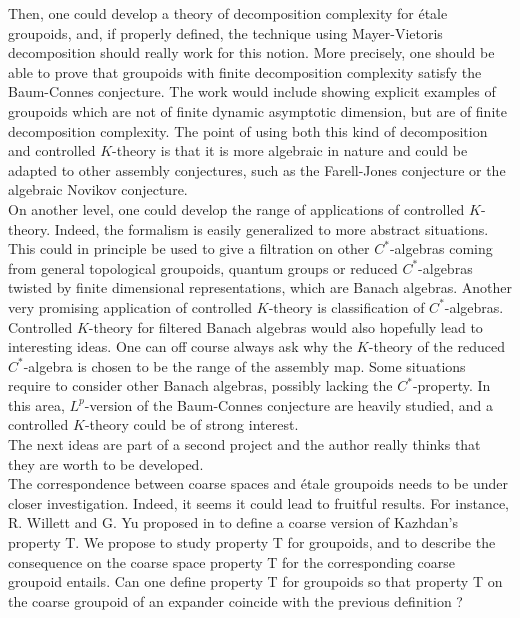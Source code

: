 Then, one could develop a theory of decomposition complexity for étale groupoids, and, if properly defined, the technique using Mayer-Vietoris decomposition should really work for this notion. More precisely, one should be able to prove that groupoids with finite decomposition complexity satisfy the Baum-Connes conjecture. The work would include showing explicit examples of groupoids which are not of finite dynamic asymptotic dimension, but are of finite decomposition complexity. The point of using both this kind of decomposition and controlled $K$-theory is that it is more algebraic in nature and could be adapted to other assembly conjectures, such as the Farell-Jones conjecture or the algebraic Novikov conjecture. \cite{RTY} \\

On another level, one could develop the range of applications of controlled $K$-theory. Indeed, the formalism is easily generalized to more abstract situations. This could in principle be used to give a filtration on other $C^*$-algebras coming from general topological groupoids, quantum groups or reduced $C^*$-algebras twisted by finite dimensional representations, which are Banach algebras. Another very promising application of controlled $K$-theory is classification of $C^*$-algebras. \\

Controlled $K$-theory for filtered Banach algebras would also hopefully lead to interesting ideas. One can off course always ask why the $K$-theory of the reduced $C^*$-algebra is chosen to be the range of the assembly map. Some situations require to consider other Banach algebras, possibly lacking the $C^*$-property. In this area, $L^p$-version of the Baum-Connes conjecture are heavily studied, and a controlled $K$-theory could be of strong interest.\\

The next ideas are part of a second project and the author really thinks that they are worth to be developed.\\

The correspondence between coarse spaces and étale groupoids needs to be under closer investigation. Indeed, it seems it could lead to fruitful results. For instance, R. Willett and G. Yu proposed in \cite{WillettYu} to define a coarse version of Kazhdan's property T. We propose to study property T for groupoids, and to describe the consequence on the coarse space property T for the corresponding coarse groupoid entails. %
Can one define property T for groupoids so that property T on the coarse groupoid of an expander coincide with the previous definition ?\\

